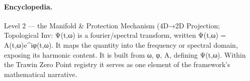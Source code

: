 \paragraph{Encyclopedia.}
Level 2 — the Manifold \& Protection Mechanism (4D→2D Projection; Topological Inv: Ψ(t,ω) is a fourier/spectral transform, written Ψ(t,ω) = A(t,ω)e\textasciicircum{}iφ(t,ω). It maps the quantity into the frequency or spectral domain, exposing its harmonic content. It is built from ω, φ, A, defining Ψ(t,ω). Within the Trawin Zero Point registry it serves as one element of the framework's mathematical narrative.
